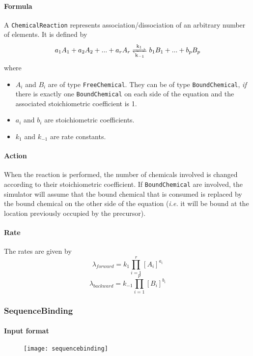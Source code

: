 \paragraph{Formula} A \texttt{ChemicalReaction} represents association/dissociation of an arbitrary number of elements. It is defined by
$$
	\reactionRev{a_1 A_1 + a_2 A_2 + ... + a_r A_r}{b_1 B_1 + ... + b_p B_p}{k_1}{k_{-1}}
$$
where
\begin{itemize}
	\item $A_i$ and $B_i$ are of type \texttt{FreeChemical}. They can be of type \texttt{BoundChemical}, \emph{if} there is exactly one \texttt{BoundChemical} on each side of the equation and the associated stoichiometric coefficient is 1. 
	\item $a_i$ and $b_i$ are stoichiometric coefficients.
	\item $k_1$ and $k_{-1}$ are rate constants.
\end{itemize}

\paragraph{Action} When the reaction is performed, the number of chemicals involved is changed according to their stoichiometric coefficient. If \texttt{BoundChemical} are involved, the simulator will assume that the bound chemical that is consumed is replaced by the bound chemical on the other side of the equation (\textit{i.e.} it will be bound at the location previously occupied by the precursor).

\paragraph{Rate} The rates are given by
$$
	\lambda_{forward} = k_1 \prod\limits_{i=1}^{r} [A_i]^{a_i}
$$
$$
	\lambda_{backward} = k_{-1} \prod\limits_{i=1}^{p} [B_i]^{b_i}
$$

\subsubsection{SequenceBinding}
\paragraph{Input format}

\begin{figure}[!ht]
	\centering
	\texttt{[image: sequencebinding]}
\end{figure}

